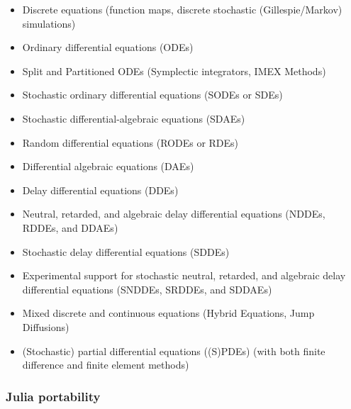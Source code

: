 \documentclass[
12pt,				%
openright,			%
oneside,			%
a4paper,			%
brazil,				%
english,			%
]{abntex2}
\begin{document}
\begin{itemize}
\item Discrete equations (function maps, discrete stochastic (Gillespie/Markov) simulations)
\item Ordinary differential equations (ODEs)
\item Split and Partitioned ODEs (Symplectic integrators, IMEX Methods)
\item Stochastic ordinary differential equations (SODEs or SDEs)
\item Stochastic differential-algebraic equations (SDAEs)
\item Random differential equations (RODEs or RDEs)
\item Differential algebraic equations (DAEs)
\item Delay differential equations (DDEs)
\item Neutral, retarded, and algebraic delay differential equations (NDDEs, RDDEs, and DDAEs)
\item Stochastic delay differential equations (SDDEs)
\item Experimental support for stochastic neutral, retarded, and algebraic delay differential equations (SNDDEs, SRDDEs, and SDDAEs)
\item Mixed discrete and continuous equations (Hybrid Equations, Jump Diffusions)
\item (Stochastic) partial differential equations ((S)PDEs) (with both finite difference and finite element methods)
\end{itemize}



\subsubsection{Julia portability}
\end{document}
